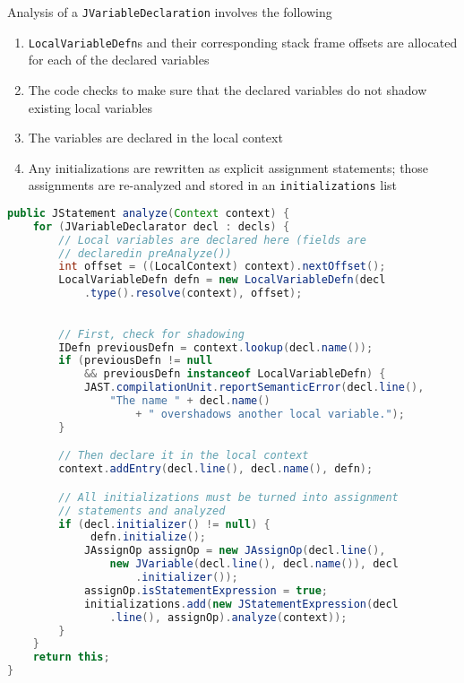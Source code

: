 \documentclass[8pt,a4paper,compress]{beamer}
\begin{document}
\begin{frame}[fragile]
\pause

Analysis of a \lstinline{JVariableDeclaration} involves the following
\begin{enumerate}
\pause
\item \lstinline{LocalVariableDefn}s and their corresponding stack frame offsets are allocated for each of the declared variables
\pause
\item The code checks to make sure that the declared variables do not shadow existing local variables
\pause
\item The variables are declared in the local context
\pause
\item Any initializations are rewritten as explicit assignment statements; those assignments are re-analyzed and stored in an \lstinline{initializations} list
\end{enumerate}

\pause
\bigskip

\begin{lstlisting}[language=Java,style=focusin]
public JStatement analyze(Context context) {
    for (JVariableDeclarator decl : decls) {
        // Local variables are declared here (fields are
        // declaredin preAnalyze())
        int offset = ((LocalContext) context).nextOffset();
        LocalVariableDefn defn = new LocalVariableDefn(decl
            .type().resolve(context), offset);
\end{lstlisting}
\end{frame}

\begin{frame}[fragile]
\pause

\begin{lstlisting}[language=Java,style=focusin]

        // First, check for shadowing
        IDefn previousDefn = context.lookup(decl.name());
        if (previousDefn != null
            && previousDefn instanceof LocalVariableDefn) {
            JAST.compilationUnit.reportSemanticError(decl.line(),
                "The name " + decl.name()
                    + " overshadows another local variable.");
        }

        // Then declare it in the local context
        context.addEntry(decl.line(), decl.name(), defn);

        // All initializations must be turned into assignment
        // statements and analyzed
        if (decl.initializer() != null) {
             defn.initialize();
            JAssignOp assignOp = new JAssignOp(decl.line(),
                new JVariable(decl.line(), decl.name()), decl
                    .initializer());
            assignOp.isStatementExpression = true;
            initializations.add(new JStatementExpression(decl
                .line(), assignOp).analyze(context));
        }
    }
    return this;
}
\end{lstlisting}
\end{frame}
\end{document}
